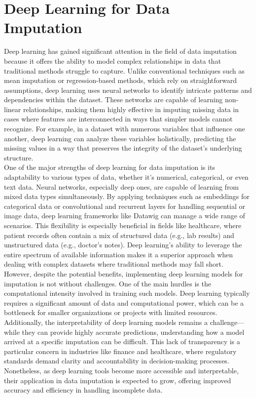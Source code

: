 \documentclass{article}
\begin{document}
\section{Deep Learning for Data Imputation}
Deep learning has gained significant attention in the field of data imputation because it offers the ability to model complex relationships in data that traditional methods struggle to capture. Unlike conventional techniques such as mean imputation or regression-based methods, which rely on straightforward assumptions, deep learning uses neural networks to identify intricate patterns and dependencies within the dataset. These networks are capable of learning non-linear relationships, making them highly effective in imputing missing data in cases where features are interconnected in ways that simpler models cannot recognize. For example, in a dataset with numerous variables that influence one another, deep learning can analyze these variables holistically, predicting the missing values in a way that preserves the integrity of the dataset’s underlying structure.
\\
One of the major strengths of deep learning for data imputation is its adaptability to various types of data, whether it’s numerical, categorical, or even text data. Neural networks, especially deep ones, are capable of learning from mixed data types simultaneously. By applying techniques such as embeddings for categorical data or convolutional and recurrent layers for handling sequential or image data, deep learning frameworks like Datawig can manage a wide range of scenarios. This flexibility is especially beneficial in fields like healthcare, where patient records often contain a mix of structured data (e.g., lab results) and unstructured data (e.g., doctor’s notes). Deep learning’s ability to leverage the entire spectrum of available information makes it a superior approach when dealing with complex datasets where traditional methods may fall short.
\\
However, despite the potential benefits, implementing deep learning models for imputation is not without challenges. One of the main hurdles is the computational intensity involved in training such models. Deep learning typically requires a significant amount of data and computational power, which can be a bottleneck for smaller organizations or projects with limited resources. Additionally, the interpretability of deep learning models remains a challenge—while they can provide highly accurate predictions, understanding how a model arrived at a specific imputation can be difficult. This lack of transparency is a particular concern in industries like finance and healthcare, where regulatory standards demand clarity and accountability in decision-making processes. Nonetheless, as deep learning tools become more accessible and interpretable, their application in data imputation is expected to grow, offering improved accuracy and efficiency in handling incomplete data.
\pagebreak
\end{document}
